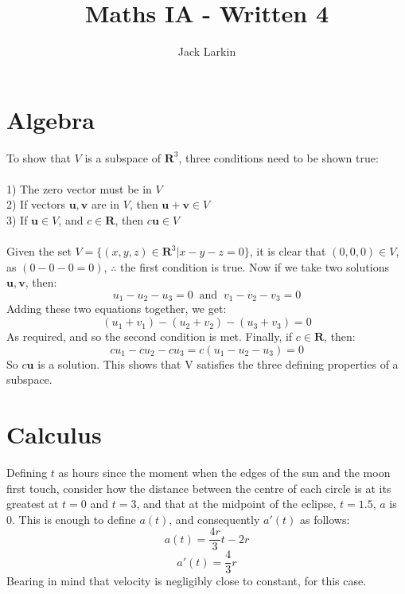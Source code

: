 \documentclass[11pt]{article}
\title{\textbf{Maths IA - Written 4}}
\date{}
\author{Jack Larkin}
\begin{document}
\maketitle

\section*{Algebra}
To show that $V$ is a subspace of $\mathbf{R}^3$, three conditions need to be shown true:\\
\\1) The zero vector must be in $V$
\\2) If vectors $\mathbf{u,v}$ are in $V$, then $\mathbf{u+v} \in V$
\\3) If $\mathbf{u}\in V$, and $c \in \mathbf{R}$, then $c\mathbf{u}\in V$\\\\
Given the set $V=\{(x,y,z)\in\mathbf{R}^3|x-y-z=0\}$, it is clear that $(0,0,0)\in V$, as $(0-0-0=0)$, $\therefore$ the first condition is true.
Now if we take two solutions $\mathbf{u,v}$, then:
$$u_1-u_2-u_3=0 \;\;\text{and}\;\;v_1-v_2-v_3=0$$
Adding these two equations together, we get:
$$(u_1+v_1)-(u_2+v_2)-(u_3+v_3)=0$$
As required, and so the second condition is met.
Finally, if $c\in\mathbf{R}$, then:
$$cu_1-cu_2-cu_3=c(u_1-u_2-u_3)=0$$
So $c\mathbf{u}$ is a solution. This shows that V satisfies the three defining properties of a subspace.
\section*{Calculus}
Defining $t$ as hours since the moment when the edges of the sun and the moon first touch, consider how the distance between the centre of each circle is at its greatest at $t=0$ and $t=3$, and that at the midpoint of the eclipse, $t=1.5$, $a$ is 0.
This is enough to define $a(t)$, and consequently $a'(t)$ as follows:
$$a(t)=\frac{4r}{3}t-2r$$
$$a'(t)=\frac{4}{3}r$$
Bearing in mind that velocity is negligibly close to constant, for this case. 
\end{document}
